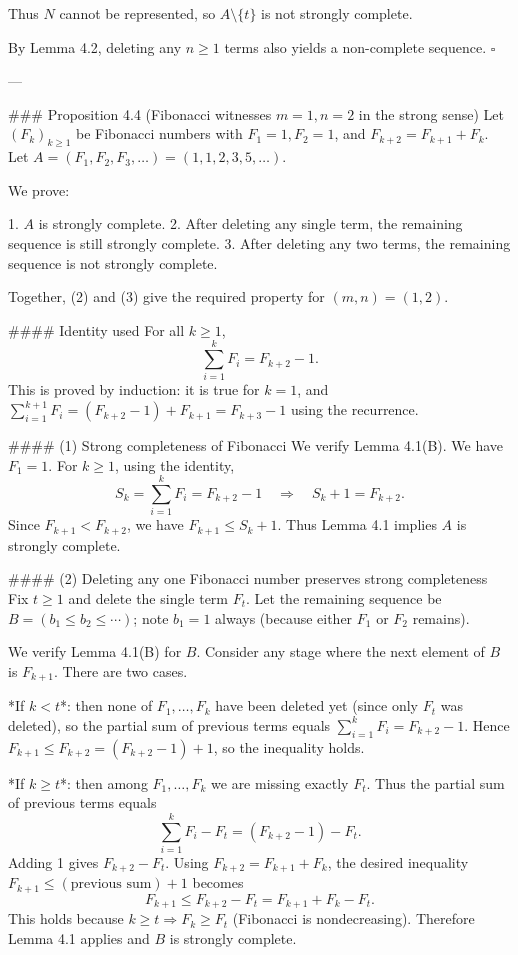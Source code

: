    Thus \(N\) cannot be represented, so \(A\setminus\{t\}\) is not strongly complete.

By Lemma 4.2, deleting any \(n\ge 1\) terms also yields a non-complete sequence. \(\square\)

---

### Proposition 4.4 (Fibonacci witnesses \(m=1,n=2\) in the strong sense)
Let \((F_k)_{k\ge 1}\) be Fibonacci numbers with \(F_1=1, F_2=1\), and \(F_{k+2}=F_{k+1}+F_k\).
Let \(A=(F_1,F_2,F_3,\dots)=(1,1,2,3,5,\dots)\).

We prove:

1. \(A\) is strongly complete.
2. After deleting any single term, the remaining sequence is still strongly complete.
3. After deleting any two terms, the remaining sequence is not strongly complete.

Together, (2) and (3) give the required property for \((m,n)=(1,2)\).

#### Identity used
For all \(k\ge 1\),
\[
\sum_{i=1}^k F_i = F_{k+2}-1.
\]
This is proved by induction: it is true for \(k=1\), and
\(\sum_{i=1}^{k+1}F_i=(F_{k+2}-1)+F_{k+1}=F_{k+3}-1\) using the recurrence.

#### (1) Strong completeness of Fibonacci
We verify Lemma 4.1(B). We have \(F_1=1\). For \(k\ge 1\), using the identity,
\[
S_k=\sum_{i=1}^k F_i = F_{k+2}-1\quad\Rightarrow\quad S_k+1=F_{k+2}.
\]
Since \(F_{k+1}<F_{k+2}\), we have \(F_{k+1}\le S_k+1\). Thus Lemma 4.1 implies \(A\) is strongly
complete.

#### (2) Deleting any one Fibonacci number preserves strong completeness
Fix \(t\ge 1\) and delete the single term \(F_t\). Let the remaining sequence be
\(B=(b_1\le b_2\le\cdots)\); note \(b_1=1\) always (because either \(F_1\) or \(F_2\) remains).

We verify Lemma 4.1(B) for \(B\). Consider any stage where the next element of \(B\) is \(F_{k+1}\).
There are two cases.

*If \(k<t\)*: then none of \(F_1,\dots,F_k\) have been deleted yet (since only \(F_t\) was deleted), so
the partial sum of previous terms equals \(\sum_{i=1}^k F_i = F_{k+2}-1\). Hence
\(F_{k+1}\le F_{k+2}= (F_{k+2}-1)+1\), so the inequality holds.

*If \(k\ge t\)*: then among \(F_1,\dots,F_k\) we are missing exactly \(F_t\). Thus the partial sum of
previous terms equals
\[
\sum_{i=1}^k F_i - F_t = (F_{k+2}-1)-F_t.
\]
Adding 1 gives \(F_{k+2}-F_t\). Using \(F_{k+2}=F_{k+1}+F_k\), the desired inequality
\(F_{k+1}\le (\text{previous sum})+1\) becomes
\[
F_{k+1}\le F_{k+2}-F_t = F_{k+1}+F_k-F_t.
\]
This holds because \(k\ge t\Rightarrow F_k\ge F_t\) (Fibonacci is nondecreasing). Therefore
Lemma 4.1 applies and \(B\) is strongly complete.

